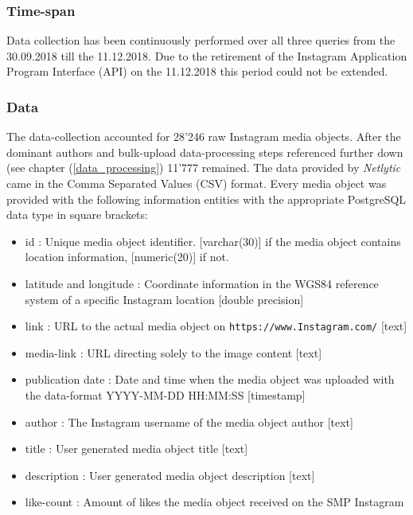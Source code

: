 \subsubsection{Time-span} \label{Instagram_timespan}
Data collection has been continuously performed over all three queries from the 30.09.2018 till the 11.12.2018. Due to the retirement of the Instagram Application Program Interface (API) on the 11.12.2018 \parencite{Instagram2018} this period could not be extended.

\subsubsection{Data} \label{Instagram_data}
The data-collection accounted for 28'246 raw Instagram media objects. After the dominant authors and bulk-upload data-processing steps referenced further down (see chapter (\ref{data_processing}) 11'777 remained.
The data provided by \textit{Netlytic} came in the Comma Separated Values (CSV) format. Every media object was provided with the following information entities with the appropriate PostgreSQL data type in square brackets:
\begin{itemize}
    \item id : Unique media object identifier. [varchar(30)] if the media object contains location information, [numeric(20)] if not.
    \item latitude and longitude : Coordinate information in the WGS84 reference system of a specific Instagram location [double precision]
    \item link : URL to the actual media object on \texttt{https://www.Instagram.com/} [text]
    \item media-link : URL directing solely to the image content [text]
    \item publication date : Date and time when the media object was uploaded with the data-format YYYY-MM-DD HH:MM:SS [timestamp]
    \item author : The Instagram username of the media object author [text]
    \item title : User generated media object title [text]
    \item description : User generated media object description [text] 
    \item like-count : Amount of likes the media object received on the SMP Instagram
\end{itemize}

